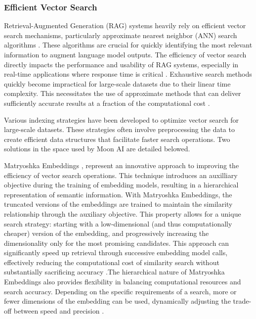 \documentclass[a4paper, oneside]{discothesis}
\begin{document}
\subsubsection{Efficient Vector Search}
Retrieval-Augmented Generation (RAG) systems heavily rely on efficient vector search mechanisms, particularly approximate nearest neighbor (ANN) search algorithms \cite{johnson2017billion}. These algorithms are crucial for quickly identifying the most relevant information to augment language model outputs. The efficiency of vector search directly impacts the performance and usability of RAG systems, especially in real-time applications where response time is critical \cite{lewis2020retrieval}. Exhaustive search methods quickly become impractical for large-scale datasets due to their linear time complexity. This necessitates the use of approximate methods that can deliver sufficiently accurate results at a fraction of the computational cost \cite{andoni2018approximate}.

Various indexing strategies have been developed to optimize vector search for large-scale datasets. These strategies often involve preprocessing the data to create efficient data structures that facilitate faster search operations. Two solutions in the space used by Moon AI are detailed belowed.

Matryoshka Embeddings \cite{kusupati2024matryoshkarepresentationlearning}, represent an innovative approach to improving the efficiency of vector search operations. This technique introduces an auxilliary objective during the training of embedding models, resulting in a hierarchical representation of semantic information. With Matryoshka Embeddings, the truncated versions of the embeddings are trained to maintain the similarity relationship through the auxiliary objective. This property allows for a unique search strategy: starting with a low-dimensional (and thus computationally cheaper) version of the embedding, and progressively increasing the dimensionality only for the most promising candidates. This approach can significantly speed up retrieval through successive embedding model calls, effectively reducing the computational cost of similarity search without substantially sacrificing accuracy \cite{kusupati2024matryoshkarepresentationlearning}.The hierarchical nature of Matryoshka Embeddings also provides flexibility in balancing computational resources and search accuracy. Depending on the specific requirements of a search, more or fewer dimensions of the embedding can be used, dynamically adjusting the trade-off between speed and precision \cite{kusupati2024matryoshkarepresentationlearning}.
\end{document}
